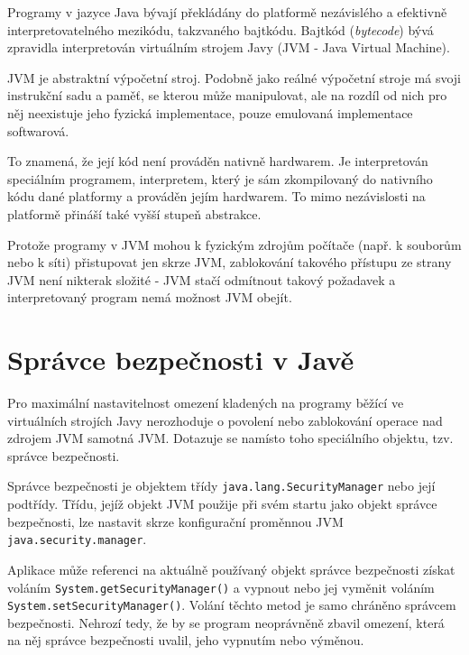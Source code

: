 Programy v jazyce Java bývají překládány do platformě nezávislého a efektivně interpretovatelného mezikódu, takzvaného bajtkódu.
Bajtkód ({\it bytecode}) bývá zpravidla interpretován virtuálním strojem Javy (JVM - Java Virtual Machine).
\cite{jvmIntro}

JVM je abstraktní výpočetní stroj. Podobně jako reálné výpočetní stroje má svoji instrukční sadu a paměť, se kterou může manipulovat, ale na rozdíl od nich pro něj neexistuje jeho fyzická implementace, pouze emulovaná implementace softwarová.
\cite{jvmIntro}

To znamená, že její kód není prováděn nativně hardwarem. Je interpretován speciálním programem, interpretem, který je sám zkompilovaný do nativního kódu dané platformy a prováděn jejím hardwarem.
To mimo nezávislosti na platformě přináší také vyšší stupeň abstrakce.
\cite{jvmIntro}

Protože programy v JVM mohou k fyzickým zdrojům počítače (např. k souborům nebo k síti) přistupovat jen skrze JVM, zablokování takového přístupu ze strany JVM není nikterak složité - JVM stačí odmítnout takový požadavek a interpretovaný program nemá možnost JVM obejít.

\section{Správce bezpečnosti v Javě} \label{securityManager}

Pro maximální nastavitelnost omezení kladených na programy běžící ve virtuálních strojích Javy nerozhoduje o povolení nebo zablokování operace nad zdrojem JVM samotná JVM. Dotazuje se namísto toho speciálního objektu, tzv. správce bezpečnosti. \cite{tutorialsTSM}

Správce bezpečnosti je objektem třídy {\tt java.lang.SecurityManager} nebo její podtřídy.
Třídu, jejíž objekt JVM použije při svém startu jako objekt správce bezpečnosti, lze nastavit skrze konfigurační proměnnou JVM {\tt java.security.manager}. \cite{javaSecurityArch}

Aplikace může referenci na aktuálně používaný objekt správce bezpečnosti získat voláním {\tt System.getSecurityManager()} a vypnout nebo jej vyměnit voláním {\tt System.setSecu\linebreak rityManager()}. Volání těchto metod je samo chráněno správcem bezpečnosti.
Nehrozí tedy, že by se program neoprávněně zbavil omezení, která na něj správce bezpečnosti uvalil, jeho vypnutím nebo výměnou.
\cite{tutorialsTSM}


